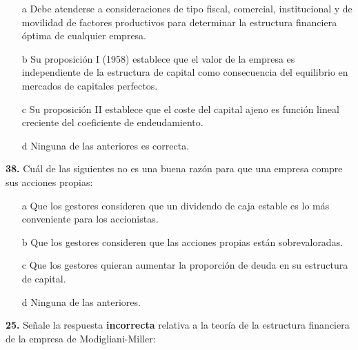 \documentclass{nuevotema}
\begin{document}
\begin{itemize}
	\item[a] Debe atenderse a consideraciones de tipo fiscal, comercial, institucional y de movilidad de factores productivos para determinar la estructura financiera óptima de cualquier empresa.
	\item[b] Su proposición I (1958) establece que el valor de la empresa es independiente de la estructura de capital como consecuencia del equilibrio en mercados de capitales perfectos.
	\item[c] Su proposición II establece que el coste del capital ajeno es función lineal creciente del coeficiente de endeudamiento.
	\item[d] Ninguna de las anteriores es correcta.
\end{itemize}

\textbf{38.} Cuál de las siguientes no es una buena razón para que una empresa compre sus acciones propias:

\begin{enumerate}
	\item[a] Que los gestores consideren que un dividendo de caja estable es lo más conveniente para los accionistas.
	\item[b] Que los gestores consideren que las acciones propias están sobrevaloradas.
	\item[c] Que los gestores quieran aumentar la proporción de deuda en su estructura de capital.
	\item[d] Ninguna de las anteriores.
\end{enumerate}

\textbf{25.} Señale la respuesta \textbf{incorrecta} relativa a la teoría de la estructura financiera de la empresa de Modigliani-Miller:
\end{document}
